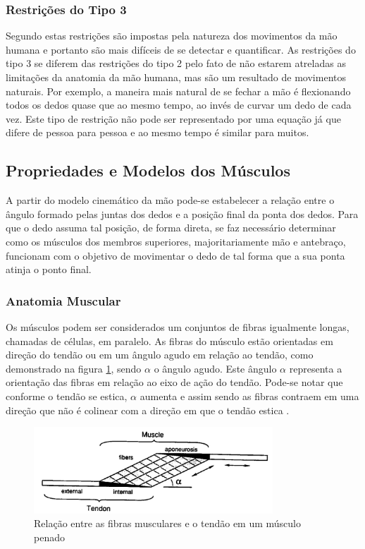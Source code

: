\subsubsection{Restrições do Tipo 3}\label{Tipo 3}
Segundo \cite{lin2000modeling} estas restrições são impostas pela natureza dos movimentos da mão humana e portanto são mais difíceis de se detectar e quantificar. As restrições do tipo 3 se diferem das restrições do tipo 2 pelo fato de não estarem atreladas as limitações da anatomia da mão humana, mas são um resultado de movimentos naturais. Por exemplo, a maneira mais natural de se fechar a mão é flexionando todos os dedos quase que ao mesmo tempo, ao invés de curvar um dedo de cada vez. Este tipo de restrição não pode ser representado por uma equação já que difere de pessoa para pessoa e ao mesmo tempo é similar para muitos.

\subsection{Propriedades e Modelos dos Músculos}\label{propriedades_musculo}
A partir do modelo cinemático da mão pode-se estabelecer a relação entre o ângulo formado pelas juntas dos dedos e a posição final da ponta dos dedos. Para que o dedo assuma tal posição, de forma direta, se faz necessário determinar como os músculos dos membros superiores, majoritariamente mão e antebraço, funcionam com o objetivo de movimentar o dedo de tal forma que a sua ponta atinja o ponto final.

\subsubsection{Anatomia Muscular}
Os músculos podem ser considerados um conjuntos de fibras igualmente longas, chamadas de células, em paralelo. As fibras do músculo estão orientadas em direção do tendão ou em um ângulo agudo em relação ao tendão, como demonstrado na figura \ref{fibras}, sendo $\alpha$ o ângulo agudo. Este ângulo $\alpha$ representa a orientação das fibras em relação ao eixo de ação do tendão. Pode-se notar que conforme o tendão se estica, $\alpha$ aumenta e assim sendo as fibras contraem em uma direção que não é colinear com a direção em que o tendão estica \cite{zajac1989muscle}.

\begin{figure}[H]
\centering
\includegraphics[width = 0.8\textwidth]{img/Zajac1989_FibrasMusculares.JPG}
\caption[Representação das Fibras Musculares]{Relação entre as fibras musculares e o tendão em um músculo penado \cite{zajac1989muscle}}
\label{fibras}
\end{figure}

